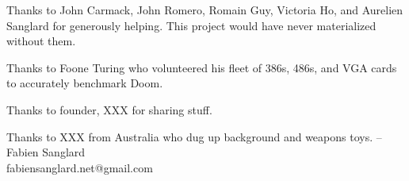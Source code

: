Thanks to John Carmack, John Romero, Romain Guy, Victoria Ho, and Aurelien Sanglard for generously helping. This project would have never materialized without them.\\ 
\par
Thanks to Foone Turing who volunteered his fleet of 386s, 486s, and VGA cards to accurately benchmark Doom.\\
\par
Thanks to  founder, XXX for sharing stuff.
\par
Thanks to XXX from  Australia who dug up background and weapons toys.
-- Fabien Sanglard\\
fabiensanglard.net@gmail.com
